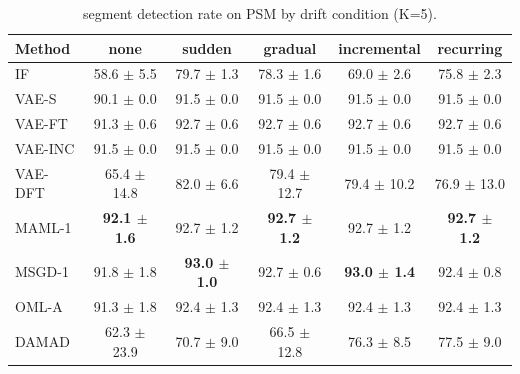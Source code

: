 \begin{table}[t]
\centering
\small
\caption{segment detection rate on PSM by drift condition (K=5).}
\label{tab:drift_segment_detection_rate_psm}
\begin{tabular}{lccccc}
\toprule
Method & none & sudden & gradual & incremental & recurring \\
\midrule
IF & 58.6 $\pm$ 5.5 & 79.7 $\pm$ 1.3 & 78.3 $\pm$ 1.6 & 69.0 $\pm$ 2.6 & 75.8 $\pm$ 2.3 \\
VAE-S & 90.1 $\pm$ 0.0 & 91.5 $\pm$ 0.0 & 91.5 $\pm$ 0.0 & 91.5 $\pm$ 0.0 & 91.5 $\pm$ 0.0 \\
VAE-FT & 91.3 $\pm$ 0.6 & 92.7 $\pm$ 0.6 & 92.7 $\pm$ 0.6 & 92.7 $\pm$ 0.6 & 92.7 $\pm$ 0.6 \\
VAE-INC & 91.5 $\pm$ 0.0 & 91.5 $\pm$ 0.0 & 91.5 $\pm$ 0.0 & 91.5 $\pm$ 0.0 & 91.5 $\pm$ 0.0 \\
VAE-DFT & 65.4 $\pm$ 14.8 & 82.0 $\pm$ 6.6 & 79.4 $\pm$ 12.7 & 79.4 $\pm$ 10.2 & 76.9 $\pm$ 13.0 \\
MAML-1 & \textbf{92.1 $\pm$ 1.6} & 92.7 $\pm$ 1.2 & \textbf{92.7 $\pm$ 1.2} & 92.7 $\pm$ 1.2 & \textbf{92.7 $\pm$ 1.2} \\
MSGD-1 & 91.8 $\pm$ 1.8 & \textbf{93.0 $\pm$ 1.0} & 92.7 $\pm$ 0.6 & \textbf{93.0 $\pm$ 1.4} & 92.4 $\pm$ 0.8 \\
OML-A & 91.3 $\pm$ 1.8 & 92.4 $\pm$ 1.3 & 92.4 $\pm$ 1.3 & 92.4 $\pm$ 1.3 & 92.4 $\pm$ 1.3 \\
DAMAD & 62.3 $\pm$ 23.9 & 70.7 $\pm$ 9.0 & 66.5 $\pm$ 12.8 & 76.3 $\pm$ 8.5 & 77.5 $\pm$ 9.0 \\
\bottomrule
\end{tabular}
\end{table}

